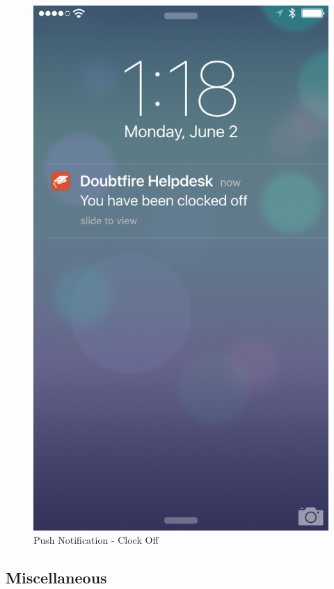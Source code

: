 \documentclass[a4paper,12pt]{article}
\begin{document}
\begin{figure}[p]
\centering
\includegraphics[scale=0.5]{7aeaf77695.png}
\caption{Push Notification - Clock Off}
\label{11}
\end{figure}



\subsection{Miscellaneous}\label{miscellaneous}
\end{document}
